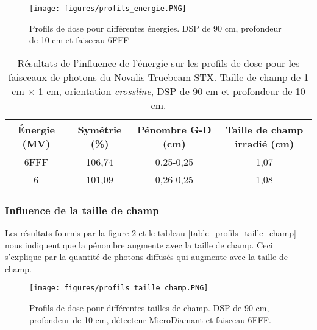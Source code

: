 \documentclass{article}
\begin{document}
\begin{figure}[h]
  \centering
  \texttt{[image: figures/profils\_energie.PNG]}
  \caption{Profils de dose pour différentes énergies. DSP de 90 cm, profondeur de 10 cm et faisceau 6FFF}
  \label{fig_profils_energie}
\end{figure}

\begin{table}[h]
  \centering
  \begin{tabular}{cccc}
    \toprule
    \bfseries Énergie (MV) & \bfseries Symétrie (\%) & \bfseries Pénombre G-D (cm) & \bfseries Taille de champ irradié (cm) \\
    \toprule
    6FFF & 106,74 & 0,25-0,25 & 1,07 \\
    6 & 101,09 & 0,26-0,25 & 1,08 \\
    \bottomrule
  \end{tabular}
  \caption{Résultats de l'influence de l'énergie sur les profils de dose pour les faisceaux de photons du Novalis Truebeam STX. Taille de champ de 1 cm $\times$ 1 cm, orientation \textit{crossline}, DSP de 90 cm et profondeur de 10 cm.}
  \label{table_profils_energie}
\end{table}

\newpage
\subsubsection{Influence de la taille de champ}

Les résultats fournis par la figure \ref*{fig_profils_taille_champ} et le tableau \ref*{table_profils_taille_champ} nous indiquent que la pénombre augmente avec la taille de champ. Ceci s'explique par la quantité de photons diffusés qui augmente avec la taille de champ.

\begin{figure}[h]
  \centering
  \texttt{[image: figures/profils\_taille\_champ.PNG]}
  \caption{Profils de dose pour différentes tailles de champ. DSP de 90 cm, profondeur de 10 cm, détecteur MicroDiamant et faisceau 6FFF.}
  \label{fig_profils_taille_champ}
\end{figure}
\end{document}
